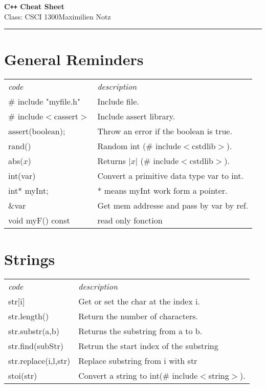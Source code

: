 \documentclass[5pt]{article}
\begin{document}
\begin{center}
     \Large{\textbf{C\texttt{++} Cheat Sheet}}\\
     \small{Class: CSCI 1300}\hfill\small{\textcopyright Maximilien Notz \the\year{}}
     \noindent\rule{20cm}{0.4pt}
\end{center}
\begin{multicols}{2}
\setcounter{secnumdepth}{0}


\section{General Reminders}
\begin{tabular}{ll}
\emph{code}             & \emph{description}\\
\# include "myfile.h"   & Include file.\\
\# include$<$cassert$>$ & Include assert library.\\
assert(boolean);        & Throw an error if the boolean is true.\\
rand()                  & Random int (\# include$<$cstdlib$>$).\\
abs($x$)                & Returns $|x|$ (\# include$<$cstdlib$>$).\\
int(var)                & Convert a primitive data type var to int.\\
int* myInt;             & * means myInt work form a pointer.\\
\&var                   & Get mem addresse and pass by var by ref.\\
void myF() const        & read only fonction\\
\end{tabular}


\section{Strings}
\begin{tabular}{ll}
\emph{code}         & \emph{description}\\
str$[$i$]$          & Get or set the char at the index i.\\
str.length()        & Return the number of characters.\\
str.substr(a,b)     & Returns the substring from a to b.\\
str.find(subStr)    & Retrun the start index of the substring\\
str.replace(i,l,str)& Replace substring from i with str\\
stoi(str)           & Convert a string to int(\# include$<$string$>$).
\end{tabular}


\end{multicols}
\end{document}
